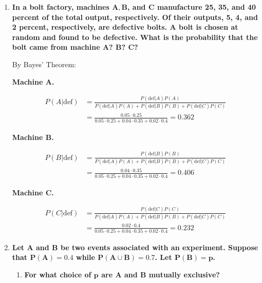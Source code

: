 \documentclass[10pt, oneside]{article}
\begin{document}
\begin{enumerate}[label=3.\arabic*]
\item  \begin{tcolorbox}[
  colback=Cerulean!5!white,
  colframe=Cerulean!75!black]
\textbf{In a bolt factory, machines $\bm{A, B}$, and $\bm{C}$ manufacture 25, 35, and 40 percent of the total output, respectively. Of their outputs, 5, 4, and 2 percent, respectively, are defective bolts. A bolt is chosen at random and found to be defective. What is the probability that the bolt came from machine $\bm{A}$? $\bm{B}$? $\bm{C}$?}
\end{tcolorbox}

By Bayes' Theorem:

\textbf{Machine A.}

\begin{align*}
P(A | \text{def}) &= \frac{ P(\text{def} | A) P(A) }{ P(\text{def} | A) P(A) + P(\text{def} | B) P(B) + P(\text{def} | C) P(C) } \\
&= \frac{0.05 \cdot 0.25}{ 0.05 \cdot 0.25 + 0.04 \cdot 0.35 + 0.02 \cdot 0.4 } = \boxed{0.362}
\end{align*}

\textbf{Machine B.}

\begin{align*}
P(B | \text{def}) &= \frac{ P(\text{def} | B) P(B) }{ P(\text{def} | A) P(A) + P(\text{def} | B) P(B) + P(\text{def} | C) P(C) } \\
&= \frac{0.04 \cdot 0.35}{ 0.05 \cdot 0.25 + 0.04 \cdot 0.35 + 0.02 \cdot 0.4 } = \boxed{0.406}
\end{align*}

\textbf{Machine C.}

\begin{align*}
P(C | \text{def}) &= \frac{ P(\text{def} | C) P(C) }{ P(\text{def} | A) P(A) + P(\text{def} | B) P(B) + P(\text{def} | C) P(C) } \\
&= \frac{0.02 \cdot 0.4}{ 0.05 \cdot 0.25 + 0.04 \cdot 0.35 + 0.02 \cdot 0.4 } = \boxed{0.232}
\end{align*}

\item  \begin{tcolorbox}[
  colback=Cerulean!5!white,
  colframe=Cerulean!75!black]
\textbf{Let $\bm{A}$ and $\bm{B}$ be two events associated with an experiment. Suppose that $\bm{P(A) = 0.4}$ while $\bm{P(A \cup B) = 0.7}$. Let $\bm{P(B) = p}$.}
\end{tcolorbox}

	\begin{enumerate}
	\item  \begin{tcolorbox}[
	  colback=Cerulean!5!white,
	  colframe=Cerulean!75!black]
	\textbf{For what choice of $\bm{p}$ are $\bm{A}$ and $\bm{B}$ mutually exclusive?}
	\end{tcolorbox}
	

\end{enumerate}
\end{enumerate}
\end{document}
